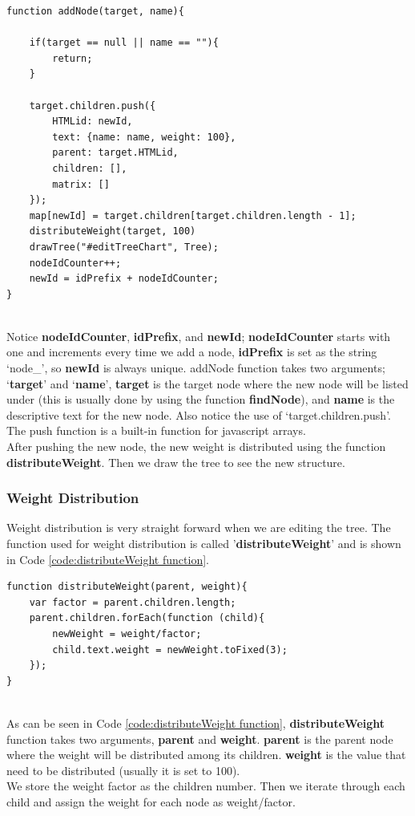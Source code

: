 \documentclass[11pt]{article} %
\begin{document}
\begin{minipage}[c]{\linewidth}
\begin{lstlisting}[basicstyle=\scriptsize, tabsize=4, frame=single, caption=addNode Function, label=code:addNode function]
function addNode(target, name){
	
	if(target == null || name == ""){
		return;
	}
	
	target.children.push({
		HTMLid: newId,
		text: {name: name, weight: 100},
		parent: target.HTMLid,
		children: [],
		matrix: []
	});
	map[newId] = target.children[target.children.length - 1];
	distributeWeight(target, 100)
	drawTree("#editTreeChart", Tree);
	nodeIdCounter++;
	newId = idPrefix + nodeIdCounter;
}
\end{lstlisting}
\end{minipage}
\\[6pt]
\noindent
Notice \textbf{nodeIdCounter}, \textbf{idPrefix}, and \textbf{newId}; \textbf{nodeIdCounter} starts with one and increments every time we add a node, \textbf{idPrefix} is set as the string `node\_', so \textbf{newId} is always unique.
\noindent
addNode function takes two arguments; `\textbf{target}' and `\textbf{name}', \textbf{target} is the target node where the new node will be listed under (this is usually done by using the function \textbf{findNode}), and \textbf{name} is the descriptive text for the new node. Also notice the use of `target.children.push'. The push function is a built-in function for javascript arrays.\\
After pushing the new node, the new weight is distributed using the function \textbf{distributeWeight}. Then we draw the tree to see the new structure.
\subsubsection{Weight Distribution}
Weight distribution is very straight forward when we are editing the tree. The function used for weight distribution is called '\textbf{distributeWeight}' and is shown in Code \ref{code:distributeWeight function}.

\noindent
\begin{minipage}[c]{\linewidth}
\begin{lstlisting}[basicstyle=\scriptsize, tabsize=4, frame=single, caption=distributeWeight Function, label=code:distributeWeight function]
function distributeWeight(parent, weight){
	var factor = parent.children.length;
	parent.children.forEach(function (child){
		newWeight = weight/factor;
		child.text.weight = newWeight.toFixed(3);
	});
}
\end{lstlisting}
\end{minipage}
\\[6pt]
As can be seen in Code \ref{code:distributeWeight function}, \textbf{distributeWeight} function takes two arguments, \textbf{parent} and \textbf{weight}. \textbf{parent} is the parent node where the weight will be distributed among its children. \textbf{weight} is the value that need to be distributed (usually it is set to 100).\\
We store the weight factor as the children number. Then we iterate through each child and assign the weight for each node as weight/factor.
\end{document}
